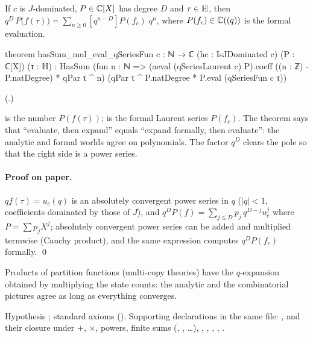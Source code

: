 \begin{theorem}\label{ch19:thm:polyq}
If $c$ is $J$-dominated, $P\in{\mathbb{C}}[X]$ has degree $D$ and $\tau\in\mathbb{H}$, then
$q^D\,P\bigl(f(\tau)\bigr)=\sum_{n\ge0}[q^{n-D}]P(f_c)\;q^n$, where $P(f_c)\in{\mathbb{C}}((q))$ is the formal evaluation.
\end{theorem}
\begin{leancode}
theorem hasSum_mul_eval_qSeriesFun {c : ℕ → ℂ} (hc : IsJDominated c) (P : ℂ[X]) (τ : ℍ) :
    HasSum (fun n : ℕ => (aeval (qSeriesLaurent c) P).coeff ((n : ℤ) - P.natDegree) * qPar τ ^ n)
      (qPar τ ^ P.natDegree * P.eval (qSeriesFun c τ))
\end{leancode}
(.)
\begin{dictionary}
 is the number $P(f(\tau))$;  is the formal Laurent series
$P(f_c)$.  The theorem says that ``evaluate, then expand'' equals ``expand formally, then evaluate'': the analytic and
formal worlds agree on polynomials.  The factor $q^D$ clears the pole so that the right side is a power series.
\end{dictionary}
\paragraph{Proof on paper.}  $q f(\tau)=u_c(q)$ is an absolutely convergent power series in $q$ ($|q|<1$, coefficients
dominated by those of $J$), and $q^DP(f)=\sum_{j\le D}p_j\,q^{D-j}u_c^j$ where $P=\sum p_jX^j$; absolutely convergent power
series can be added and multiplied termwise (Cauchy product), and the same expression computes $q^DP(f_c)$ formally.
\qed
\begin{physics}
Products of partition functions (multi-copy theories) have the $q$-expansion obtained by multiplying the state counts:
the analytic and the combinatorial pictures agree as long as everything converges.
\end{physics}
\begin{status}
Hypothesis ; standard axioms ().  Supporting declarations in the same
file: ,  and their closure under $+$, $\times$, powers, finite sums
(, , \dots), ,
, , ,
.
\end{status}

